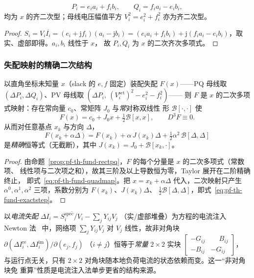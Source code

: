 \begin{proposition}[直角坐标注入功率]\label{prop:pf-th-fund-rectpq}
\begin{equation}
P_i=e_ia_i+f_ib_i,\qquad Q_i=f_ia_i-e_ib_i,
\label{eq:pf-th-fund-rectpq}
\end{equation}
均为 $x$ 的齐二次型；母线电压幅值平方 $V_i^2=e_i^2+f_i^2$ 亦为齐二次型。
\end{proposition}
\begin{proof}
$S_i=V_i\overline{I_i}=(e_i+\mathrm jf_i)(a_i-\mathrm jb_i)
=(e_ia_i+f_ib_i)+\mathrm j(f_ia_i-e_ib_i)$，取实、虚部即得。$a_i,b_i$ 线性于 $x$，
故 $P_i,Q_i$ 为 $x$ 的二次齐次多项式。
\end{proof}

\subsubsection{失配映射的精确二次结构}
\begin{theorem}[潮流失配是二次多项式映射]\label{thm:pf-th-fund-quadmap}
以直角坐标未知量 $x$（slack 的 $e,f$ 固定）装配失配 $F(x)$——PQ 母线取
$(\Delta P_i,\Delta Q_i)$、PV 母线取 $(\Delta P_i,\ (V_i^{\mathrm{set}})^2-e_i^2-f_i^2)$——
则 $F$ 是 $x$ 的二次多项式映射：存在常向量 $c_0$、常矩阵 $J_0$ 与\emph{常}对称双线性
形 $\mathcal B[\cdot,\cdot]$ 使
\begin{equation}
F(x)=c_0+J_0x+\tfrac12\mathcal B[x,x],\qquad D^3F\equiv0 .
\label{eq:pf-th-fund-quadmap}
\end{equation}
从而对任意基点 $x_k$ 与方向 $\Delta$，
\begin{equation}
F(x_k+\alpha\Delta)=F(x_k)+\alpha\,J(x_k)\Delta+\tfrac12\alpha^2\,\mathcal B[\Delta,\Delta]
\label{eq:pf-th-fund-exactstep}
\end{equation}
是\emph{精确}恒等式（无截断），其中 $J(x_k)=J_0+\mathcal B[x_k,\cdot]$。
\end{theorem}
\begin{proof}
由命题~\ref{prop:pf-th-fund-rectpq}，$F$ 的每个分量是 $x$ 的二次多项式（常数项、
线性项与二次项之和），故其三阶及以上导数恒为零，Taylor 展开在二阶精确终止，
即式~\eqref{eq:pf-th-fund-quadmap}。把 $x=x_k+\alpha\Delta$ 代入，二次映射只产生
$\alpha^0,\alpha^1,\alpha^2$ 三项，系数分别为 $F(x_k)$、$J(x_k)\Delta$、
$\tfrac12\mathcal B[\Delta,\Delta]$，即式~\eqref{eq:pf-th-fund-exactstep}。
\end{proof}

\begin{remark}[电流注入雅可比的常量非对角块]\label{rem:pf-th-fund-ci}
以\emph{电流失配} $\Delta I_i=\overline{S_i^{\mathrm{spec}}/V_i}-\sum_jY_{ij}V_j$
（实/虚部堆叠）为方程的电流注入 Newton 法~\cite{pff:dacosta} 中，网络项
$\sum_jY_{ij}V_j$ 对 $V_j$ 线性，故非对角块
$\partial(\Delta I_i^{\mathrm{re}},\Delta I_i^{\mathrm{im}})/\partial(e_j,f_j)$
（$i\ne j$）恒等于\emph{常量} $2\times2$ 实块
$\left[\begin{smallmatrix}-G_{ij}&\phantom{-}B_{ij}\\-B_{ij}&-G_{ij}\end{smallmatrix}\right]$，
与运行点无关，只有 $2\times2$ 对角块随本地负荷电流的状态依赖而变。这一“非对角块免
重算”性质是电流注入法单步更省的结构来源。
\end{remark}

